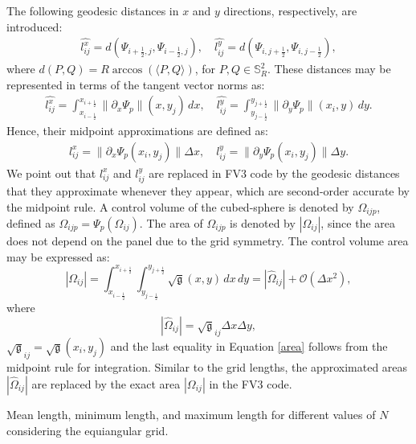 \documentclass[preprint,12pt]{elsarticle}
\begin{document}
\begin{linenumbers}
The following geodesic distances in $x$ and $y$ directions, respectively, are introduced:
\begin{align}
	\label{distcube}
	\widehat{l^x_{ij}} = d(\Psi_{i+\frac{1}{2},j},\Psi_{i-\frac{1}{2},j}) , \quad
	\widehat{l^y_{ij}} = d(\Psi_{i,j+\frac{1}{2}},\Psi_{i,j-\frac{1}{2}}),
\end{align}
where $d(P,Q) = R\arccos{(\langle P, Q \rangle)}$, for $P,Q \in \mathbb{S}^2_R$.
These distances may be represented in terms of the tangent vector norms as:
\begin{align}
	\widehat{l^x_{ij}} = 
	\int_{x_{i-\frac{1}{2}}}^{x_{i+\frac{1}{2}}}
	\|\partial_x  {\Psi}_{p}\|(x,y_j) \,dx ,\quad
	\widehat{l^y_{ij}} =
	\int_{y_{j-\frac{1}{2}}}^{y_{j+\frac{1}{2}}}
	\|\partial_y {\Psi}_{p}\|(x_i,y) \,dy.
\end{align}
Hence, their midpoint approximations are defined as:
\begin{align}
	\label{distcube2}
	{l^x_{ij}} = \|\partial_x {\Psi}_{p}(x_i,y_j)  \|\Delta x,\quad
	{l^y_{ij}} = \|\partial_y {\Psi}_{p}(x_i,y_j) \|\Delta y.
\end{align}
We point out that ${l^x_{ij}}$ and ${l^y_{ij}}$ are replaced in FV3 code by the geodesic distances that they approximate whenever they appear, which are second-order accurate by the midpoint rule.
A control volume of the cubed-sphere is denoted by $\Omega_{ijp}$, defined as $\Omega_{ijp} = {\Psi}_p(\Omega_{ij})$.
The area of $\Omega_{ijp}$ is denoted by $|\Omega_{ij}|$,
since the area does not depend on the panel due to the grid symmetry.
The control volume area may be expressed as:
\begin{equation}
	\label{area}
	|\Omega_{ij}| = \int_{x_{i-\frac{1}{2}}}^{x_{i+\frac{1}{2}}} \int_{y_{j-\frac{1}{2}}}^{y_{j+\frac{1}{2}}}{\sqrt{\mathfrak{g}}(x,y)} \,dx \,dy = 
	|\hat{\Omega}_{ij}| + \mathcal{O}(\Delta x^2),
\end{equation}
where 
\begin{equation}
	\label{area2}
	|\hat{\Omega}_{ij}| = \sqrt{\mathfrak{g}}_{ij} \Delta x \Delta y,
\end{equation} $\sqrt{\mathfrak{g}}_{ij}=\sqrt{\mathfrak{g}}(x_i,y_j) $
and the last equality in Equation \eqref{area} follows from the midpoint rule for integration.
Similar to the grid lengths, the approximated areas $|\hat{\Omega}_{ij}|$ are replaced by the exact area $|\Omega_{ij}|$ in the FV3 code.
\begin{table}[htbp]
	\centering
	\caption{Mean length, minimum length, and maximum length for different values of $N$ considering the equiangular grid.\label{g2-dx-table}}

\end{table}
\end{linenumbers}
\end{document}
